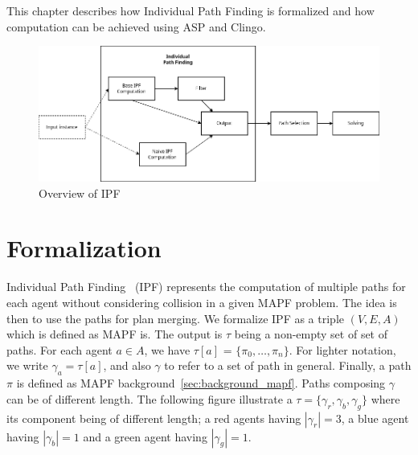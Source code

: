\label{sec:ipf}
This chapter describes how Individual Path Finding is formalized and how computation can be achieved using ASP and Clingo. 

\begin{figure}[H]
    \centering
    \caption{Overview of IPF}\label{fig:overview_ipf}
    \includegraphics[width=\widthimg]{img/overview_ipf.drawio.png}
\end{figure}

\section{Formalization}

Individual Path Finding~\cite{luis2020plan,delling2009engineering} (IPF) represents the computation of multiple paths for each agent without considering collision in a given MAPF problem. The idea is then to use the paths for plan merging. We formalize IPF as a triple \((V,E,A)\) which is defined as MAPF is. The output is \(\tau\) being a non-empty set of set of paths. For each agent \(a \in A\), we have \(\tau[a]\) = \(\{\pi_0,\dots,\pi_n\}\). For lighter notation, we write \(\gamma_a = \tau[a]\), and also \(\gamma\) to refer to a set of path in general. Finally, a path \(\pi\) is defined as MAPF background~\ref{sec:background_mapf}. Paths composing \(\gamma\) can be of different length. The following figure illustrate a \(\tau = \{\gamma_r, \gamma_b, \gamma_g\}\) where its component being of different length; a red agents having \(|\gamma_r|=3\), a blue agent having \(|\gamma_b|=1\) and a green agent having \(|\gamma_g|=1\). 

